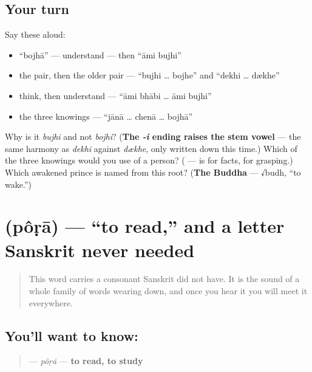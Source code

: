 \subsection*{Your turn}
Say these aloud:

\begin{itemize}
\raggedright
  \item \textquotedblleft{}bojhā\textquotedblright{} — understand — then \textquotedblleft{}āmi bujhi\textquotedblright{}
  \item the pair, then the older pair — \textquotedblleft{}bujhi … bojhe\textquotedblright{} and \textquotedblleft{}dekhi … dækhe\textquotedblright{}
  \item think, then understand — \textquotedblleft{}āmi bhābi … āmi bujhi\textquotedblright{}
  \item the three knowings — \textquotedblleft{}jānā … chenā … bojhā\textquotedblright{}
\end{itemize}

\begin{tcolorbox}[breakable,colback=teal!4,colframe=teal!35!black,title={Before you move on}]
Why is it \emph{bujhi} and not \emph{bojhi}? (\textbf{The \emph{-i} ending raises the stem vowel} — the same harmony as \emph{dekhi} against \emph{dækhe}, only written down this time.) Which of the three knowings would you use of a person? (\textbf{} —  is for facts,  for grasping.) Which awakened prince is named from this root? (\textbf{The Buddha} — √budh, \textquotedblleft{}to wake.\textquotedblright{})
\end{tcolorbox}
\section[\texorpdfstring{\bn{পড়া} (pôṛā)}{পড়া (pôṛā)}]{ (pôṛā) — \textquotedblleft{}to read,\textquotedblright{} and a letter Sanskrit never needed}

\label{lesson:BN-C08-pora}



\begin{quote}
This word carries a consonant Sanskrit did not have. It is the sound of a whole family of words wearing down, and once you hear it you will meet it everywhere.
\end{quote}

\subsection*{You'll want to know: }
\begin{quote}
\textbf{} — \emph{pôṛā} — \textbf{to read, to study}
\end{quote}

